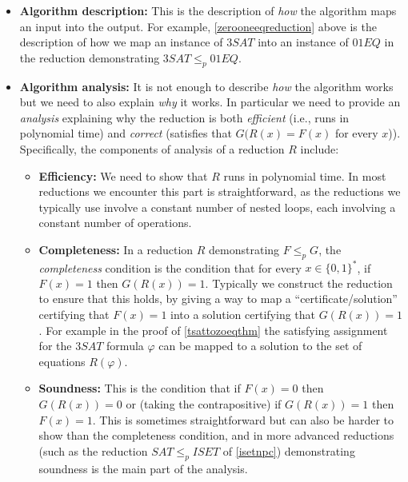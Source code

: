 \begin{itemize}
\item
  \textbf{Algorithm description:} This is the description of \emph{how}
  the algorithm maps an input into the output. For example,
  \cref{zerooneeqreduction} above is the description of how we map an
  instance of \(3\ensuremath{\mathit{SAT}}\) into an instance of
  \(01\ensuremath{\mathit{EQ}}\) in the reduction demonstrating
  \(3\ensuremath{\mathit{SAT}} \leq_p 01\ensuremath{\mathit{EQ}}\).
\item
  \textbf{Algorithm analysis:} It is not enough to describe \emph{how}
  the algorithm works but we need to also explain \emph{why} it works.
  In particular we need to provide an \emph{analysis} explaining why the
  reduction is both \emph{efficient} (i.e., runs in polynomial time) and
  \emph{correct} (satisfies that \(G(R(x)=F(x)\) for every \(x\))).
  Specifically, the components of analysis of a reduction \(R\) include:

  \begin{itemize}
  \item
    \textbf{Efficiency:} We need to show that \(R\) runs in polynomial
    time. In most reductions we encounter this part is straightforward,
    as the reductions we typically use involve a constant number of
    nested loops, each involving a constant number of operations.
  \item
    \textbf{Completeness:} In a reduction \(R\) demonstrating
    \(F \leq_p G\), the \emph{completeness} condition is the condition
    that for every \(x\in \{0,1\}^*\), if \(F(x) = 1\) then
    \(G(R(x))=1\). Typically we construct the reduction to ensure that
    this holds, by giving a way to map a ``certificate/solution''
    certifying that \(F(x)=1\) into a solution certifying that
    \(G(R(x))=1\). For example in the proof of \cref{tsattozoeqthm} the
    satisfying assignment for the \(3\ensuremath{\mathit{SAT}}\) formula
    \(\varphi\) can be mapped to a solution to the set of equations
    \(R(\varphi)\).
  \item
    \textbf{Soundness:} This is the condition that if \(F(x)=0\) then
    \(G(R(x))=0\) or (taking the contrapositive) if \(G(R(x))=1\) then
    \(F(x)=1\). This is sometimes straightforward but can also be harder
    to show than the completeness condition, and in more advanced
    reductions (such as the reduction
    \(\ensuremath{\mathit{SAT}} \leq_p \ensuremath{\mathit{ISET}}\) of
    \cref{isetnpc}) demonstrating soundness is the main part of the
    analysis.
  \end{itemize}
\end{itemize}


